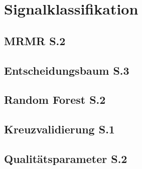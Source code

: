 \thispagestyle{plain}
\chapter{Signalklassifikation}
\section{MRMR S.2}
\section{Entscheidungsbaum S.3}

\section{Random Forest S.2}
\section{Kreuzvalidierung S.1}
\section{Qualitätsparameter S.2}